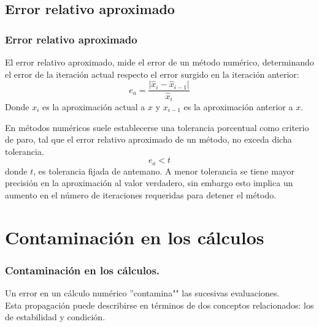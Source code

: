 \subsection{Error relativo aproximado}
\begin{frame}
\frametitle{Error relativo aproximado}
El error relativo aproximado, mide el error de un método numérico, determinando el error de la iteración actual respecto el error surgido en la iteración anterior:
\[ e_{a} = \dfrac{\vert \widehat{x}_{i} - \widehat{x}_{i-1} \vert}{\widehat{x}_{i}}\]
Donde $x_{i}$ es la aproximación actual a $x$ y 
$x_{i-1}$ es la aproximación anterior a $x$.
\end{frame}
\begin{frame}
En métodos numéricos suele establecerse una tolerancia porcentual como criterio de paro, tal
que el error relativo aproximado de un método, no exceda dicha tolerancia.
\[ e_{a} < t \]
donde $t$, es tolerancia fijada de antemano. A menor tolerancia se tiene mayor precisión en la
aproximación al valor verdadero, sin embargo esto implica un aumento en el número de iteraciones requeridas para detener el método.
\end{frame}
\section{Contaminación en los cálculos}
\begin{frame}
\frametitle{Contaminación en los cálculos.}
Un error en un cálculo numérico ''contamina"" las sucesivas evaluaciones.
\\
\bigskip
Esta propagación puede describirse en términos de dos conceptos relacionados: los de estabilidad y condición.
\end{frame}
